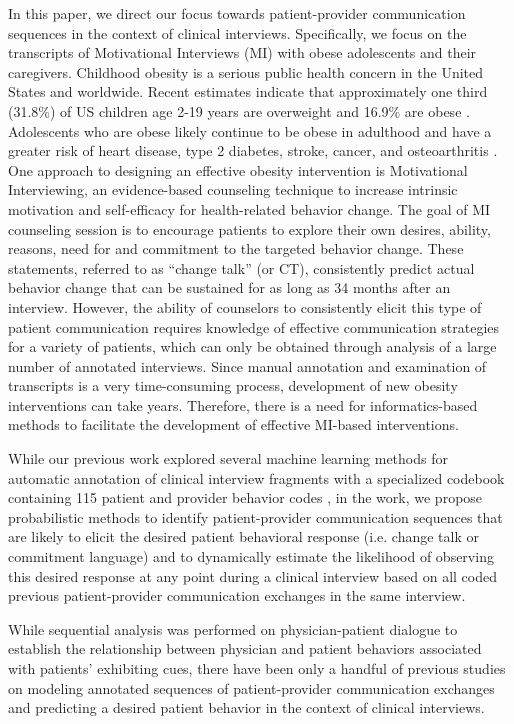 \documentclass{amia}
\begin{document}
In this paper, we direct our focus towards patient-provider communication sequences in the context of clinical interviews. Specifically, we focus on the transcripts of Motivational Interviews (MI) with obese adolescents and their caregivers. Childhood obesity is a serious public health concern in the United States and worldwide. Recent estimates indicate that approximately one third (31.8\%) of US children age 2-19 years are overweight and 16.9\% are obese \cite{ogden2012prevalence}. Adolescents who are obese likely continue to be obese in adulthood and have a greater risk of heart disease, type 2 diabetes, stroke, cancer, and osteoarthritis \cite{general2010surgeon}. One approach to designing an effective obesity intervention is Motivational Interviewing, an evidence-based counseling technique to increase intrinsic motivation and self-efficacy for health-related behavior change. The goal of MI counseling session is to encourage patients to explore their own desires, ability, reasons, need for and commitment to the targeted behavior change. These statements, referred to as ``change talk'' (or CT), consistently predict actual behavior change that can be sustained for as long as 34 months after an interview. However, the ability of counselors to consistently elicit this type of patient communication requires knowledge of effective communication strategies for a variety of patients, which can only be obtained through analysis of a large number of annotated interviews. Since manual annotation and examination of transcripts is a very time-consuming process, development of new obesity interventions can take years. Therefore, there is a need for informatics-based methods to facilitate the development of effective MI-based interventions. 

While our previous work \cite{kotov2015interpretable, hasan2016study} explored several machine learning methods for automatic annotation of clinical interview fragments with a specialized codebook containing 115 patient and provider behavior codes \cite{carcone2013provider}, in the work, we propose probabilistic methods to identify patient-provider communication sequences that are likely to elicit the desired patient behavioral response (i.e. change talk or commitment language) and to dynamically estimate the likelihood of observing this desired response at any point during a clinical interview based on all coded previous patient-provider communication exchanges in the same interview.

While sequential analysis \cite{eide2004physician} was performed on physician-patient dialogue to establish the relationship between physician and patient behaviors associated with patients' exhibiting cues, there have been only a handful of previous studies on modeling annotated sequences of patient-provider communication exchanges and predicting a desired patient behavior in the context of clinical interviews.   
\end{document}
